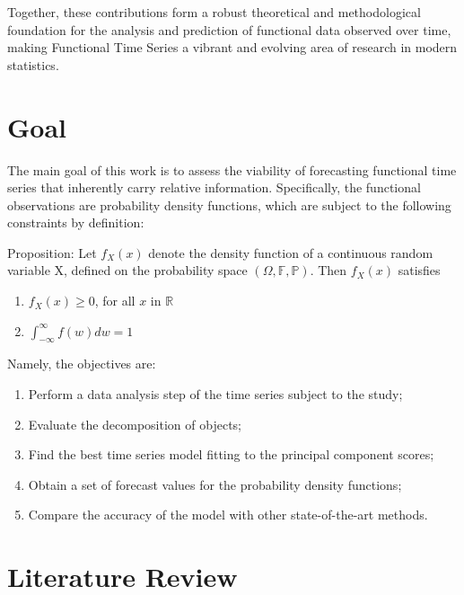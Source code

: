 \documentclass[article]{abntex2}
\begin{document}
Together, these contributions form a robust theoretical and methodological foundation for the analysis and prediction of functional data observed over time, making Functional Time Series a vibrant and evolving area of research in modern statistics.





\section{Goal}
The main goal of this work is to assess the viability of forecasting functional time series that inherently carry relative information. Specifically, the functional observations are probability density functions, which are subject to the following constraints by definition:

Proposition: Let $f_X(x)$ denote the density function of a continuous random variable X,  defined on the probability space $(\Omega, \mathbb{F}, \mathbb{P})$. Then $f_X(x)$ satisfies
\begin{enumerate}
    \item $f_X(x)\geq0$, for all $x$ in $\mathbb{R}$
    \item $\int_{-\infty}^{\infty}f(w)dw=1$
\end{enumerate}

Namely, the objectives are:
\begin{enumerate}
    \item Perform a data analysis step of the time series subject to the study;
    \item Evaluate the decomposition of objects;
    \item Find the best time series model fitting to the principal component scores;
    \item Obtain a set of forecast values for the probability density functions;
    \item Compare the accuracy of the model with other state-of-the-art methods.
\end{enumerate}



\section{Literature Review}
\end{document}
